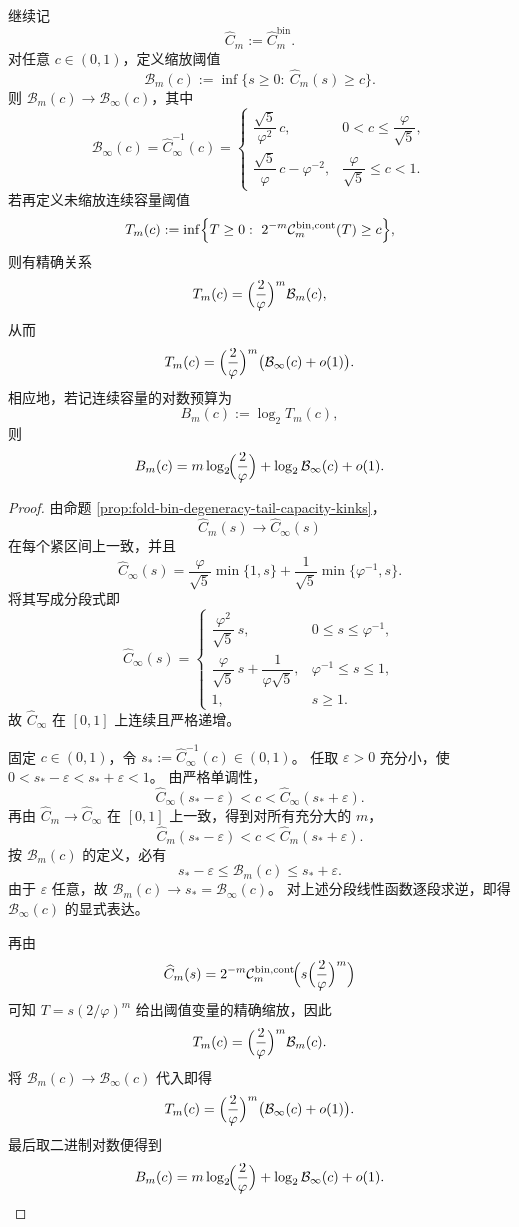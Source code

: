 \begin{theorem}[连续容量反函数的二段精确律]\label{thm:killo-fold-bin-capacity-inverse-two-regime}
继续记
\[
\widehat C_m:=\widehat C_m^{\mathrm{bin}}.
\]
对任意 \(c\in(0,1)\)，定义缩放阈值
\[
\mathcal B_m(c):=\inf\{s\ge 0:\ \widehat C_m(s)\ge c\}.
\]
则 \(\mathcal B_m(c)\to \mathcal B_\infty(c)\)，其中
\[
\mathcal B_\infty(c)=\widehat C_\infty^{-1}(c)
=
\begin{cases}
\dfrac{\sqrt5}{\varphi^2}\,c,
& 0<c\le \dfrac{\varphi}{\sqrt5},\\[2ex]
\dfrac{\sqrt5}{\varphi}\,c-\varphi^{-2},
& \dfrac{\varphi}{\sqrt5}\le c<1.
\end{cases}
\]
若再定义未缩放连续容量阈值
\[
T_m(c):=\inf\Bigl\{T\ge 0:\ 2^{-m}\mathcal C_m^{\mathrm{bin,cont}}(T)\ge c\Bigr\},
\]
则有精确关系
\[
T_m(c)=\Bigl(\frac{2}{\varphi}\Bigr)^m\mathcal B_m(c),
\]
从而
\[
T_m(c)=\Bigl(\frac{2}{\varphi}\Bigr)^m\bigl(\mathcal B_\infty(c)+o(1)\bigr).
\]
相应地，若记连续容量的对数预算为
\[
B_m(c):=\log_2 T_m(c),
\]
则
\[
B_m(c)=m\log_2\!\Bigl(\frac{2}{\varphi}\Bigr)+\log_2\mathcal B_\infty(c)+o(1).
\]
\end{theorem}
\begin{proof}
由命题 \ref{prop:fold-bin-degeneracy-tail-capacity-kinks}，
\[
\widehat C_m(s)\to \widehat C_\infty(s)
\]
在每个紧区间上一致，并且
\[
\widehat C_\infty(s)=\frac{\varphi}{\sqrt5}\min\{1,s\}+\frac{1}{\sqrt5}\min\{\varphi^{-1},s\}.
\]
将其写成分段式即
\[
\widehat C_\infty(s)=
\begin{cases}
\dfrac{\varphi^2}{\sqrt5}\,s, & 0\le s\le \varphi^{-1},\\[2ex]
\dfrac{\varphi}{\sqrt5}\,s+\dfrac{1}{\varphi\sqrt5}, & \varphi^{-1}\le s\le 1,\\[2ex]
1, & s\ge 1.
\end{cases}
\]
故 \(\widehat C_\infty\) 在 \([0,1]\) 上连续且严格递增。

固定 \(c\in(0,1)\)，令 \(s_\ast:=\widehat C_\infty^{-1}(c)\in(0,1)\)。
任取 \(\varepsilon>0\) 充分小，使 \(0<s_\ast-\varepsilon<s_\ast+\varepsilon<1\)。
由严格单调性，
\[
\widehat C_\infty(s_\ast-\varepsilon)<c<\widehat C_\infty(s_\ast+\varepsilon).
\]
再由 \(\widehat C_m\to \widehat C_\infty\) 在 \([0,1]\) 上一致，得到对所有充分大的 \(m\)，
\[
\widehat C_m(s_\ast-\varepsilon)<c<\widehat C_m(s_\ast+\varepsilon).
\]
按 \(\mathcal B_m(c)\) 的定义，必有
\[
s_\ast-\varepsilon\le \mathcal B_m(c)\le s_\ast+\varepsilon.
\]
由于 \(\varepsilon\) 任意，故 \(\mathcal B_m(c)\to s_\ast=\mathcal B_\infty(c)\)。
对上述分段线性函数逐段求逆，即得 \(\mathcal B_\infty(c)\) 的显式表达。

再由
\[
\widehat C_m(s)=2^{-m}\mathcal C_m^{\mathrm{bin,cont}}\!\Bigl(s\Bigl(\frac{2}{\varphi}\Bigr)^m\Bigr)
\]
可知 \(T=s(2/\varphi)^m\) 给出阈值变量的精确缩放，因此
\[
T_m(c)=\Bigl(\frac{2}{\varphi}\Bigr)^m\mathcal B_m(c).
\]
将 \(\mathcal B_m(c)\to \mathcal B_\infty(c)\) 代入即得
\[
T_m(c)=\Bigl(\frac{2}{\varphi}\Bigr)^m\bigl(\mathcal B_\infty(c)+o(1)\bigr).
\]
最后取二进制对数便得到
\[
B_m(c)=m\log_2\!\Bigl(\frac{2}{\varphi}\Bigr)+\log_2\mathcal B_\infty(c)+o(1).
\]
\end{proof}

\endinput
